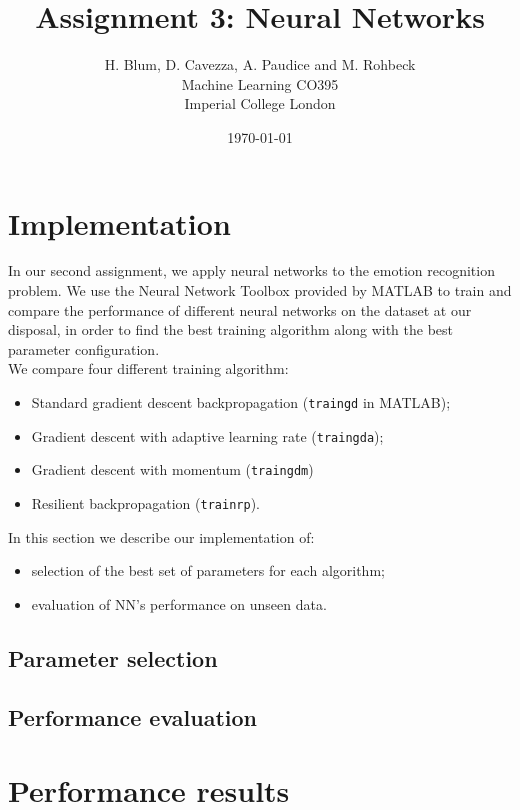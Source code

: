 \documentclass{article}
\begin{document}
\author{H. Blum, D. Cavezza, A. Paudice and M. Rohbeck\\
 Machine Learning CO395\\
  Imperial College London}
\date{\today}
\title{Assignment 3: Neural Networks}
\maketitle

\section{Implementation}
In our second assignment, we apply neural networks to the emotion recognition problem. We use the Neural Network Toolbox provided by MATLAB to train and compare the performance of different neural networks on the dataset at our disposal, in order to find the best training algorithm along with the best parameter configuration.\\
We compare four different training algorithm:
\begin{itemize}
	\item Standard gradient descent backpropagation (\verb$traingd$ in MATLAB);
	\item Gradient descent with adaptive learning rate (\verb$traingda$);
	\item Gradient descent with momentum (\verb$traingdm$)
	\item Resilient backpropagation (\verb$trainrp$).
\end{itemize}
In this section we describe our implementation of:
\begin{itemize}
	\item selection of the best set of parameters for each algorithm;
	\item evaluation of NN's performance on unseen data.
\end{itemize}

\subsection{Parameter selection}


\subsection{Performance evaluation}


\section{Performance results}
\end{document}
